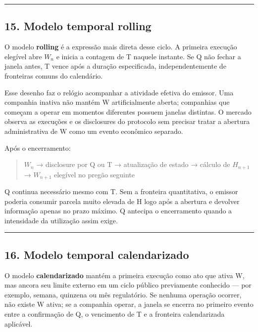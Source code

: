 \documentclass[
  a4paper,
]{article}
\begin{document}
\begin{center}\rule{0.5\linewidth}{0.5pt}\end{center}

\hypertarget{15-modelo-temporal-rolling}{}

\hypertarget{15-modelo-temporal-rolling}{%
\subsection{15. Modelo temporal
rolling}\label{15-modelo-temporal-rolling}}

O modelo \textbf{rolling} é a expressão mais direta desse ciclo. A
primeira execução elegível abre \(W_n\) e inicia a contagem de T naquele
instante. Se Q não fechar a janela antes, T vence após a duração
especificada, independentemente de fronteiras comuns do calendário.

Esse desenho faz o relógio acompanhar a atividade efetiva do emissor.
Uma companhia inativa não mantém W artificialmente aberta; companhias
que começam a operar em momentos diferentes possuem janelas distintas. O
mercado observa as execuções e os disclosures do protocolo sem precisar
tratar a abertura administrativa de W como um evento econômico separado.

Após o encerramento:

\begin{quote}
\(W_n\) → disclosure por Q ou T → atualização de estado → cálculo de
\(H_{n+1}\) → \(W_{n+1}\) elegível no pregão seguinte
\end{quote}

Q continua necessário mesmo com T. Sem a fronteira quantitativa, o
emissor poderia consumir parcela muito elevada de H logo após a abertura
e devolver informação apenas no prazo máximo. Q antecipa o encerramento
quando a intensidade da utilização assim exige.

\begin{center}\rule{0.5\linewidth}{0.5pt}\end{center}

\hypertarget{16-modelo-temporal-calendarizado}{}

\hypertarget{16-modelo-temporal-calendarizado}{%
\subsection{16. Modelo temporal
calendarizado}\label{16-modelo-temporal-calendarizado}}

O modelo \textbf{calendarizado} mantém a primeira execução como ato que
ativa W, mas ancora seu limite externo em um ciclo público previamente
conhecido --- por exemplo, semana, quinzena ou mês regulatório. Se
nenhuma operação ocorrer, não existe W ativa; se a companhia operar, a
janela se encerra no primeiro evento entre a confirmação de Q, o
vencimento de T e a fronteira calendarizada aplicável.
\end{document}
